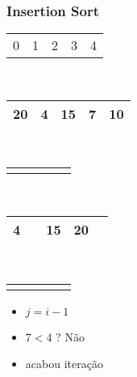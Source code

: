 \documentclass{beamer}
\begin{document}
\begin{frame}
    \frametitle{Insertion Sort}
    \begin{center}
        \begin{table}
            \begin{tabular}{p{0.25cm} p{0.25cm} p{0.25cm} p{0.25cm} p{0.25cm}}
                0 & 1 & 2 & 3 & 4
            \end{tabular} \\
            \begin{tabular}{| p{0.25cm} | p{0.25cm} | p{0.25cm} | p{0.25cm} | p{0.25cm} |}
                \hline
                20 & 4 & 15 & 7 & 10 \\ \hline
            \end{tabular} \\
            \begin{tabular}{p{0.25cm} p{0.25cm} p{0.25cm} p{0.25cm} p{0.25cm}}
                & & & \color{green}{$\uparrow$} &
            \end{tabular} \\
            \begin{tabular}{| p{0.25cm} | p{0.25cm} | p{0.25cm} | p{0.25cm} | p{0.25cm} |}
                \hline
                4 & & 15 & 20 & \\ \hline
            \end{tabular} \\
            \begin{tabular}{p{0.25cm} p{0.25cm} p{0.25cm} p{0.25cm} p{0.25cm}}
                \color{red}{$\uparrow$} & \color{blue}{$\uparrow$} & & &
            \end{tabular}
        \end{table}
	\end{center}
    \color{green}{$ordenando = 7$}
    \begin{itemize}[<+->]
        \item $j = i - 1$
        \item $7 < 4$ ? Não
        \item acabou iteração
    \end{itemize}
\end{frame}
\end{document}
